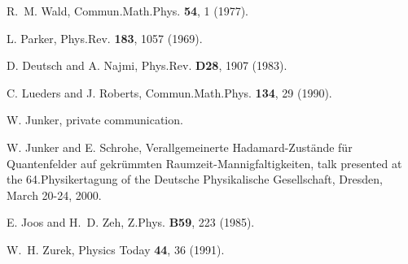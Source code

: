 \documentclass[a4paper,10pt,oneside]{amsart}
\theoremstyle{plain}
\theoremstyle{definition}
\theoremstyle{remark}
\begin{document}
\begin{thebibliography}{10}
R.~M. Wald, Commun.Math.Phys. {\bf 54},  1  (1977).

L. Parker, Phys.Rev. {\bf 183},  1057  (1969).

D. Deutsch and A. Najmi, Phys.Rev. {\bf D28},  1907  (1983).

C. Lueders and J. Roberts, Commun.Math.Phys. {\bf 134},  29
(1990).

W. Junker, private communication.

W. Junker and E. Schrohe, Verallgemeinerte Hadamard-Zust\"{a}nde
f\"{u}r
  Quantenfelder auf gekr\"{u}mmten Raumzeit-Mannigfaltigkeiten, talk presented
  at the 64.Physikertagung of the Deutsche Physikalische Gesellschaft, Dresden,
  March 20-24, 2000.

E. Joos and H.~D. Zeh, Z.Phys. {\bf B59},  223  (1985).

W.~H. Zurek, Physics Today {\bf 44},  36  (1991).

\end{thebibliography}
\end{document}
